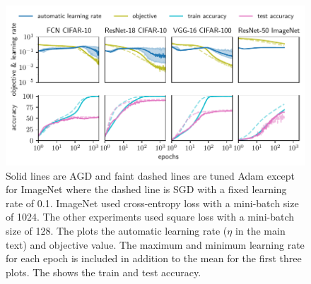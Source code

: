 \begin{figure}
    \centering
    \includegraphics[width=\textwidth]{figures/pdf/plot1_full}
    \caption{ Solid lines are AGD and faint dashed lines are tuned Adam except for ImageNet where the dashed line is SGD with a fixed learning rate of 0.1. ImageNet used cross-entropy loss with a mini-batch size of 1024. The other experiments used square loss with a mini-batch size of 128.
    The  plots the automatic learning rate ($\eta$ in the main text) and objective value. The maximum and minimum learning rate for each epoch is included in addition to the mean for the first three plots. The  shows the train and test accuracy.
    }\label{fig:1}
\end{figure}